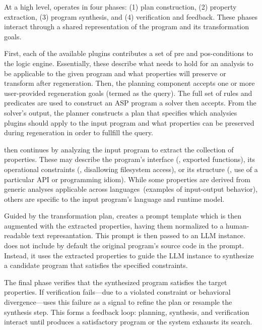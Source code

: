 \documentclass[a4paper,twoside,12pt]{report} %
\begin{document}
At a high level, \sys operates in four phases: (1) plan construction, (2)
property extraction, (3) program synthesis, and (4) verification and feedback.
These phases interact through a shared representation of the program and its
transformation goals.

First, each of the available plugins contributes a set of pre and pos-conditions 
to the logic engine.
Essentially, these describe what needs to hold for an analysis to be applicable to the given 
program and what properties \sys will preserve or transform after regeneration.
Then, the planning component accepts one or more user-provided regeneration goals (termed as the query).
The full set of rules and predicates are used to construct an ASP program
a solver then accepts.
From the solver's output, the planner constructs a plan that specifies which
analysies \sys plugins should apply to the input program and what properties can be
preserved during regeneration in order to fullfill the query.

 \sys then continues by analyzing the input program to
extract the collection of properties.
These may describe the program's interface
(\eg, exported functions), its operational constraints (\eg, disallowing
filesystem access), or its structure (\eg, use of a particular API or programming idiom).
While some properties are derived from generic analyses
applicable across languages~(\eg examples of input-output behavior), others are specific to the input program's language and runtime model.

Guided by the transformation plan, \sys creates a prompt template which is then
augmented with the extracted properties, having them normalized to a human-readable text represantation.
This prompt is then passed to an LLM instance.
\sys does not include by default the original program's source code in the prompt.
Instead, it uses the extracted properties to guide the LLM instance 
to synthesize a candidate program that satisfies the specified constraints.

The final phase verifies that the
synthesized program satisfies the target properties.
If verification fails---due to a violated constraint or behavioral divergence---\sys uses this
failure as a signal to refine the plan or resample the synthesis step.
This forms a feedback loop: planning, synthesis, and verification interact until \sys
produces a satisfactory program or the system exhausts its search.
\end{document}
